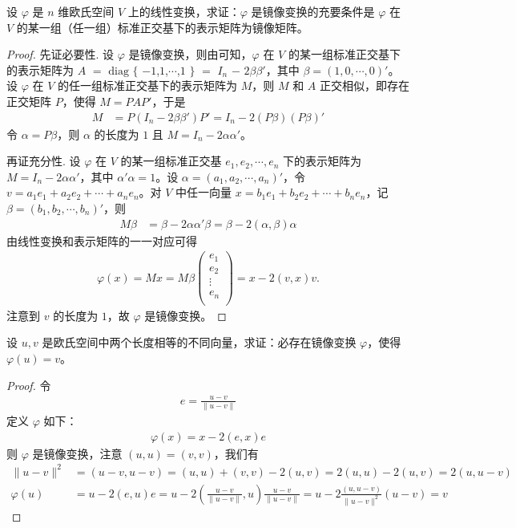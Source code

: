 \documentclass[../../main.tex]{subfiles}%
\begin{document}
\begin{proposition}\label{proposition:例9.41}
设 \(\varphi\) 是 \(n\) 维欧氏空间 \(V\) 上的线性变换，求证：\(\varphi\) 是镜像变换的充要条件是 \(\varphi\) 在 \(V\) 的某一组（任一组）标准正交基下的表示矩阵为镜像矩阵。
\end{proposition}
\begin{proof}
先证必要性. 设 \(\varphi\) 是镜像变换，则由可知，\(\varphi\) 在 \(V\) 的某一组标准正交基下的表示矩阵为 $A$ $=$ $\mathrm{diag}$ $\{$ $-1$,$1$,$\cdots$,$1$ $\}$ $=$ $I_n$ $-$ $2\beta\beta'$，其中 \(\beta = (1,0,\cdots,0)'\)。设 \(\varphi\) 在 \(V\) 的任一组标准正交基下的表示矩阵为 \(M\)，则 \(M\) 和 \(A\) 正交相似，即存在正交矩阵 \(P\)，使得 \(M = PAP'\)，于是
\begin{align*}
M &= P(I_n - 2\beta\beta')P' = I_n - 2(P\beta)(P\beta)'
\end{align*}
令 \(\alpha = P\beta\)，则 \(\alpha\) 的长度为 \(1\) 且 \(M = I_n - 2\alpha\alpha'\)。

再证充分性. 设 \(\varphi\) 在 \(V\) 的某一组标准正交基 \(e_1,e_2,\cdots,e_n\) 下的表示矩阵为 \(M = I_n - 2\alpha\alpha'\)，其中 \(\alpha'\alpha = 1\)。设 \(\alpha = (a_1,a_2,\cdots,a_n)'\)，令 \(v = a_1e_1 + a_2e_2 + \cdots + a_ne_n\)。对 \(V\) 中任一向量 \(x = b_1e_1 + b_2e_2 + \cdots + b_ne_n\)，记 \(\beta = (b_1,b_2,\cdots,b_n)'\)，则
\begin{align*}
M\beta &= \beta - 2\alpha\alpha'\beta = \beta - 2(\alpha,\beta)\alpha
\end{align*}
由线性变换和表示矩阵的一一对应可得
\begin{align*}
\varphi (x)=Mx=M\beta \left( \begin{array}{c}
e_1\\
e_2\\
\vdots\\
e_n\\
\end{array} \right) =x-2(v,x)v.
\end{align*}
注意到 \(v\) 的长度为 \(1\)，故 \(\varphi\) 是镜像变换。
\end{proof}

\begin{proposition}\label{proposition:例9.42}
设 \(u,v\) 是欧氏空间中两个长度相等的不同向量，求证：必存在镜像变换 \(\varphi\)，使得 \(\varphi(u) = v\)。
\end{proposition}
\begin{proof}
令
\begin{align*}
e = \frac{u - v}{\|u - v\|}
\end{align*}
定义 \(\varphi\) 如下：
\begin{align*}
\varphi(x) = x - 2(e,x)e
\end{align*}
则 \(\varphi\) 是镜像变换，注意 \((u,u) = (v,v)\)，我们有
\begin{align*}
\|u - v\|^2 &= (u - v,u - v) = (u,u) + (v,v) - 2(u,v) = 2(u,u) - 2(u,v) = 2(u,u - v)\\
\varphi(u) &= u - 2(e,u)e = u - 2\left(\frac{u - v}{\|u - v\|},u\right)\frac{u - v}{\|u - v\|} = u - 2\frac{(u,u - v)}{\|u - v\|^2}(u - v) = v
\end{align*}
\end{proof}
\end{document}
